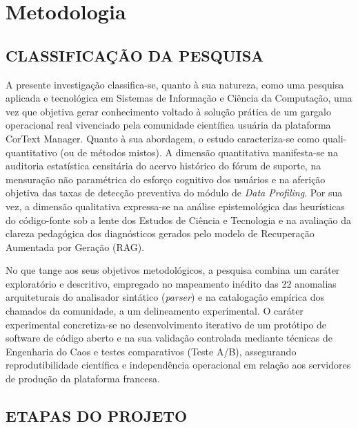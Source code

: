 \documentclass[
	oneside,
	a4paper,
	12pt,
	chapter=TITLE,
	section=TITLE,
	english,
	brazilian
]{abntex2}
\begin{document}
\FloatBarrier


\chapter{Metodologia}\label{sec:metodologia}


\FloatBarrier
\section{CLASSIFICAÇÃO DA PESQUISA}\label{sec:classificacao_da_pesquisa}


A presente investigação classifica-se, quanto à sua natureza, como uma pesquisa aplicada e tecnológica em Sistemas de Informação e Ciência da Computação, uma vez que objetiva gerar conhecimento voltado à solução prática de um gargalo operacional real vivenciado pela comunidade científica usuária da plataforma CorText Manager. Quanto à sua abordagem, o estudo caracteriza-se como quali-quantitativo (ou de métodos mistos). A dimensão quantitativa manifesta-se na auditoria estatística censitária do acervo histórico do fórum de suporte, na mensuração não paramétrica do esforço cognitivo dos usuários \cite{Kruskal1952,Mann1947} e na aferição objetiva das taxas de detecção preventiva do módulo de \textit{Data Profiling}. Por sua vez, a dimensão qualitativa expressa-se na análise epistemológica das heurísticas do código-fonte sob a lente dos Estudos de Ciência e Tecnologia \cite{Latour1987,Bowker1999} e na avaliação da clareza pedagógica dos diagnósticos gerados pelo modelo de Recuperação Aumentada por Geração (RAG).

No que tange aos seus objetivos metodológicos, a pesquisa combina um caráter exploratório e descritivo, empregado no mapeamento inédito das 22 anomalias arquiteturais do analisador sintático (\textit{parser}) e na catalogação empírica dos chamados da comunidade, a um delineamento experimental. O caráter experimental concretiza-se no desenvolvimento iterativo de um protótipo de software de código aberto e na sua validação controlada mediante técnicas de Engenharia do Caos e testes comparativos (Teste A/B), assegurando reprodutibilidade científica e independência operacional em relação aos servidores de produção da plataforma francesa.

\FloatBarrier
\section{ETAPAS DO PROJETO}\label{sec:etapas_do_projeto}
\end{document}
